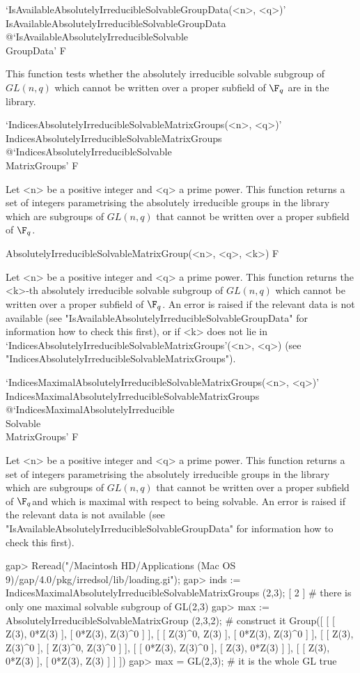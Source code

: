 \>`IsAvailableAbsolutelyIrreducibleSolvableGroupData(<n>, <q>)'%
{IsAvailableAbsolutelyIrreducibleSolvableGroupData}%
@{`IsAvailableAbsolutelyIrreducibleSolvable\\GroupData'} F

This function tests whether the
absolutely irreducible solvable subgroup of $GL(n,q)$ which
cannot be written over a proper subfield of $\F_q$ are in the {\IRREDSOL} library.


\>`IndicesAbsolutelyIrreducibleSolvableMatrixGroups(<n>, <q>)'%
{IndicesAbsolutelyIrreducibleSolvableMatrixGroups}%
@{`IndicesAbsolutelyIrreducibleSolvable\\MatrixGroups'} F

Let <n> be a  positive integer and <q> a prime power. This
function returns a set of integers parametrising the absolutely irreducible groups in the
{\IRREDSOL} library which are subgroups of $GL(n,q)$ that cannot be written over a proper
subfield of
$\F_q$.


\>AbsolutelyIrreducibleSolvableMatrixGroup(<n>, <q>, <k>) F

Let <n> be a  positive integer and <q> a prime power. This
function returns the <k>-th absolutely irreducible solvable subgroup of $GL(n,q)$ which
cannot be written over a proper subfield of $\F_q$. An error is raised if the relevant
data is not available (see "IsAvailableAbsolutelyIrreducibleSolvableGroupData" for information 
how to check this first), or if <k> does not lie in
`IndicesAbsolutelyIrreducibleSolvableMatrixGroups'(<n>, <q>)
(see "IndicesAbsolutelyIrreducibleSolvableMatrixGroups").


\>`IndicesMaximalAbsolutelyIrreducibleSolvableMatrixGroups(<n>, <q>)'%
{IndicesMaximalAbsolutelyIrreducibleSolvableMatrixGroups}%
@{`IndicesMaximalAbsolutelyIrreducible\\Solvable\\MatrixGroups'} F

Let <n> be a  positive integer and <q> a prime power. This
function returns a set of integers parametrising the absolutely irreducible groups in the
{\IRREDSOL} library which are subgroups of $GL(n,q)$ that cannot be written over a proper
subfield of
$\F_q $and which is maximal with
respect to being solvable. An error is raised if the relevant
data is not available (see "IsAvailableAbsolutelyIrreducibleSolvableGroupData" for information 
how to check this first).

\beginexample
gap> Reread("/Macintosh HD/Applications (Mac OS 9)/gap/4.0/pkg/irredsol/lib/loading.gi");
gap> inds := IndicesMaximalAbsolutelyIrreducibleSolvableMatrixGroups (2,3);
[ 2 ] # there is only one maximal solvable subgroup of GL(2,3)
gap> max := AbsolutelyIrreducibleSolvableMatrixGroup (2,3,2); # construct it
Group([ [ [ Z(3), 0*Z(3) ], [ 0*Z(3), Z(3)^0 ] ], [ [ Z(3)^0, Z(3) ], [ 0*Z(3), Z(3)^0 ] ], 
  [ [ Z(3), Z(3)^0 ], [ Z(3)^0, Z(3)^0 ] ], [ [ 0*Z(3), Z(3)^0 ], [ Z(3), 0*Z(3) ] ], 
  [ [ Z(3), 0*Z(3) ], [ 0*Z(3), Z(3) ] ] ])
gap> max = GL(2,3); # it is the whole GL
true
\endexample


